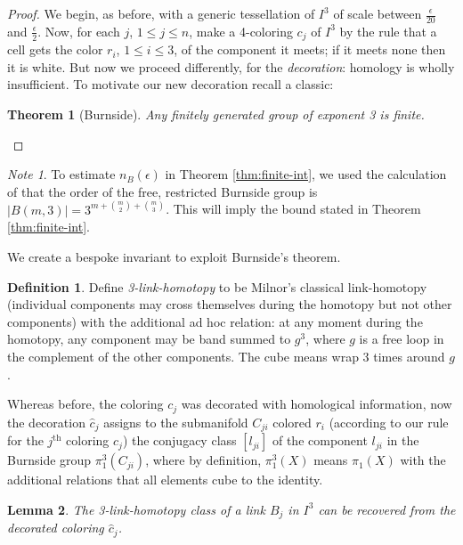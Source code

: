 \documentclass[12pt]{amsart}
\newcommand{\abs}[1]{\left\lvert #1 \right\rvert}
\newtheorem{thm}{Theorem}
\newtheorem{lemma}[thm]{Lemma}
\theoremstyle{definition}
\newtheorem*{defin*}{Definition}
\theoremstyle{remark}
\newtheorem*{note}{Note}
\begin{document}
\begin{proof}
	We begin, as before, with a generic tessellation of $I^3$ of scale between $\frac{\epsilon}{20}$ and $\frac{\epsilon}{2}$. Now, for each $j$, $1 \leq j \leq n$, make a 4-coloring $c_j$ of $I^3$ by the rule that a cell gets the color $r_i$, $1 \leq i \leq 3$, of the component it meets; if it meets none then it is white. But now we proceed differently, for the \emph{decoration}: homology is wholly insufficient. To motivate our new decoration recall a classic:

	\begin{thm}[Burnside]
		Any finitely generated group of exponent 3 is finite.
	\end{thm}
\end{proof}

\begin{note}
	To estimate $n_B(\epsilon)$ in Theorem \ref{thm:finite-int}, we used the calculation of \cite{LB33} that the order of the free, restricted Burnside group is $\abs{B(m,3)} = 3^{m + \binom{m}{2} + \binom{m}{3}}$. This will imply the bound stated in Theorem \ref{thm:finite-int}.
\end{note}

We create a bespoke invariant to exploit Burnside's theorem.

\begin{defin*}
	Define \emph{3-link-homotopy} to be Milnor's classical link-homotopy \cite{milnor54} (individual components may cross themselves during the homotopy but not other components) with the additional ad hoc relation: at any moment during the homotopy, any component may be band summed to $g^3$, where $g$ is a free loop in the complement of the other components. The cube means wrap 3 times around $g$.
\end{defin*}

Whereas before, the coloring $c_j$ was decorated with homological information, now the decoration $\hat{c}_j$ assigns to the submanifold $C_{ji}$ colored $r_i$ (according to our rule for the $j^{\text{th}}$ coloring $c_j$) the conjugacy class $[l_{ji}]$ of the component $l_{ji}$ in the Burnside group $\pi_1^3(C_{ji})$, where by definition, $\pi_1^3(X)$ means $\pi_1(X)$ with the additional relations that all elements cube to the identity.

\begin{lemma}\label{lm:3-link}
	The 3-link-homotopy class of a link $B_j$ in $I^3$ can be recovered from the decorated coloring $\hat{c}_j$.
\end{lemma}
\end{document}

